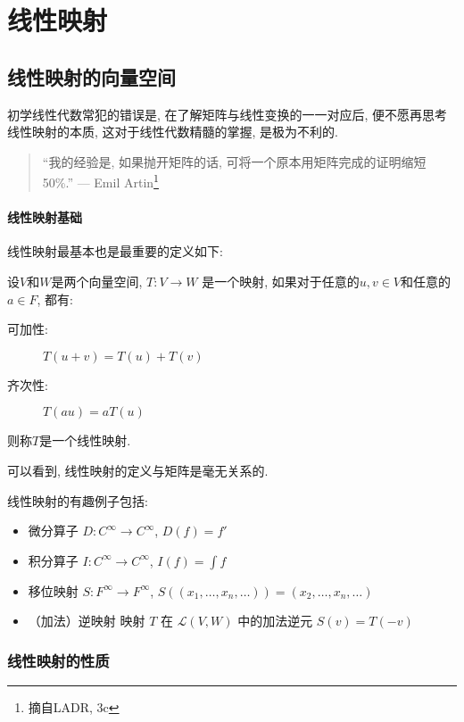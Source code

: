 \chapter{线性映射}
\section{线性映射的向量空间}
初学线性代数常犯的错误是, 在了解矩阵与线性变换的一一对应后, 便不愿再思考线性映射的本质, 这对于线性代数精髓的掌握, 是极为不利的.
\begin{quote}
    ``我的经验是, 如果抛开矩阵的话, 可将一个原本用矩阵完成的证明缩短 50\%.''
    \hfill --- Emil Artin\footnote{摘自LADR, 3c}
\end{quote}
\subsubsection{线性映射基础}
线性映射最基本也是最重要的定义如下:
\begin{definition}
    设\(V\)和\(W\)是两个向量空间, \(T: V \to W\) 是一个映射, 如果对于任意的\(u,
    v \in V\)和任意的\(a \in F\), 都有:
    \begin{description}
        \item[可加性:] \(T(u+v)=T(u)+T(v)\)
        \item[齐次性:] \(T(a u) = a T(u)\)
    \end{description}
    则称\(T\)是一个线性映射.
\end{definition}
可以看到, 线性映射的定义与矩阵是毫无关系的.

线性映射的有趣例子包括:
\begin{itemize}
    \item 微分算子 \(D: C^{\infty} \to C^{\infty}\), \(D(f) = f'\)
    \item 积分算子 \(I: C^{\infty} \to C^{\infty}\), \(I(f) = \int f\)
    \item 移位映射 \(S: F^{\infty} \to F^{\infty}\),
        \(S((x_{1},\ldots, x_{n}, \ldots)) = (x_{2},\ldots,
        x_{n}, \ldots)\)
    \item （加法）逆映射 映射 \(T\) 在 \(\mathcal{L}(V,W)\) 中的加法逆元
        \(S(v)=T(-v)\)
\end{itemize}
\subsection{线性映射的性质}

